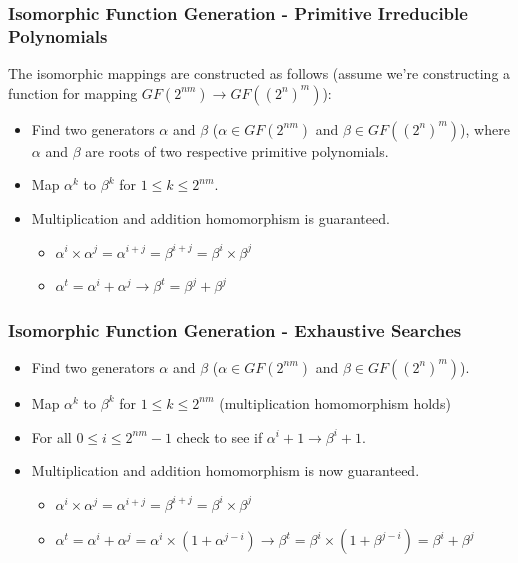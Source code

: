 \documentclass[handout]{beamer}
\begin{document}
\begin{frame}
	\frametitle{Isomorphic Function Generation - Primitive Irreducible Polynomials}
	The isomorphic mappings are constructed as follows (assume we're constructing a function for mapping $GF(2^{nm}) \to GF((2^n)^m)$):
	\begin{itemize}
		\item Find two generators $\alpha$ and $\beta$ ($\alpha \in GF(2^{nm})$ and $\beta \in GF((2^n)^m)$), where $\alpha$ and $\beta$ are roots of two respective primitive polynomials.
		\item Map $\alpha^k$ to $\beta^k$ for $1 \leq k \leq 2^{nm}$.
		\item Multiplication and addition homomorphism is guaranteed. 
		\begin{itemize}
			\item $\alpha^i \times \alpha^j = \alpha^{i + j} = \beta^{i + j} = \beta^i \times \beta^j$
			\item $\alpha^t = \alpha^i + \alpha^j \to \beta^t = \beta^j + \beta^j$
		\end{itemize}
	\end{itemize}
\end{frame}

\begin{frame}
	\frametitle{Isomorphic Function Generation - Exhaustive Searches}
	\begin{itemize}
		\item Find two generators $\alpha$ and $\beta$ ($\alpha \in GF(2^{nm})$ and $\beta \in GF((2^n)^m)$).
		\item Map $\alpha^k$ to $\beta^k$ for $1 \leq k \leq 2^{nm}$ (multiplication homomorphism holds)
		\item For all $0 \leq i \leq 2^{nm} - 1$ check to see if $\alpha^i + 1 \to \beta^i + 1$.
		\item Multiplication and addition homomorphism is now guaranteed.
		\begin{itemize}
			\item $\alpha^i \times \alpha^j = \alpha^{i + j} = \beta^{i + j} = \beta^i \times \beta^j$
			\item $\alpha^t = \alpha^i + \alpha^j = \alpha^i \times (1 + \alpha^{j - i}) \to \beta^t = \beta^i \times (1 + \beta^{j - i}) = \beta^i + \beta^j$
		\end{itemize}
	\end{itemize}
\end{frame}
\end{document}
